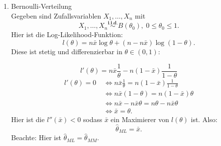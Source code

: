 \documentclass[10pt]{article}
\newcommand{\FZV}{X_1, \ldots, X_n} %
\newenvironment{BSP}[1][]
{\begin{Beispiel}[frametitle=#1]}{\end{Beispiel}}
\begin{document}
	\begin{BSP}[Maximum-Likelihood]
		\begin{enumerate}[label = (\roman*)]
			\item Bernoulli-Verteilung \\
			Gegeben sind Zufallsvariablen $\FZV$ mit
			\begin{equation*}
				\FZV \overset{\textbf{i.i.d.}}{\sim} B(\theta_0), \; 0 \leq \theta_0 \leq 1.
			\end{equation*} 
			Hier ist die Log-Likelihood-Funktion:
			\begin{equation*}
				l(\theta)=n\bar{x}\log\theta + (n-n\bar{x})\log(1-\theta).
			\end{equation*}
			Diese ist stetig und differenzierbar in $\theta \in (0,1)$:
			
			\begin{equation*}
				l'(\theta) = n\bar{x}\frac{1}{\theta} - n (1-\bar{x}) \frac{1}{1-\theta}
			\end{equation*}
			\begin{equation*}
				\begin{split}
					l'(\theta) = 0 \; &\Leftrightarrow n\bar{x}\frac{1}{\theta} = n(1-\bar{x})\frac{1}{1-\theta} \\&\Leftrightarrow n\bar{x}(1-\theta) = n(1-\bar{x})\theta\\ &\Leftrightarrow n \bar{x}-n\bar{x}\theta = n\theta-n\bar{x}\theta \\&\Leftrightarrow \bar{x} = \theta.
				\end{split}
			\end{equation*}
			Hier ist die $l''(\bar{x})<0$ sodass $\bar{x}$ ein Maximierer von $l(\theta)$ ist. Also:
			\begin{equation*}
				\hat{\theta}_{ML} = \bar{x}.
			\end{equation*}
			Beachte: Hier ist $\hat{\theta}_{ML} = \hat{\theta}_{MM}$.
			

\end{enumerate}
\end{BSP}
\end{document}
